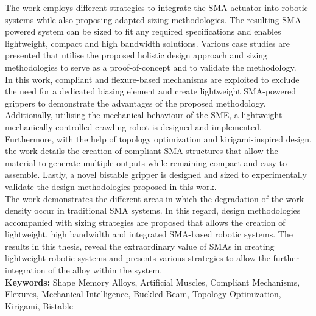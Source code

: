 The work employs different strategies to integrate the SMA actuator into robotic systems while also proposing adapted sizing methodologies. The resulting SMA-powered system can be sized to fit any required specifications and enables lightweight, compact and high bandwidth solutions. Various case studies are presented that utilise the proposed holistic design approach and sizing methodologies to serve as a proof-of-concept and to validate the methodology.\\

In this work, compliant and flexure-based mechanisms are exploited to exclude the need for a dedicated biasing element and create lightweight SMA-powered grippers to demonstrate the advantages of the proposed methodology. Additionally, utilising the mechanical behaviour of the SME, a lightweight mechanically-controlled crawling robot is designed and implemented. Furthermore, with the help of topology optimization and kirigami-inspired design, the work details the creation of compliant SMA structures that allow the material to generate multiple outputs while remaining compact and easy to assemble. Lastly, a novel bistable gripper is designed and sized to experimentally validate the design methodologies proposed in this work.\\

The work demonstrates the different areas in which the degradation of the work density occur in traditional SMA systems. In this regard, design methodologies accompanied with sizing strategies are proposed that allows the creation of lightweight, high bandwidth and integrated SMA-based robotic systems. The results in this thesis, reveal the extraordinary value of SMAs in creating lightweight robotic systems and presents various strategies to allow the further integration of the alloy within the system.\\

\textbf{Keywords:} Shape Memory Alloys, Artificial Muscles, Compliant Mechanisms, Flexures, Mechanical-Intelligence, Buckled Beam, Topology Optimization, Kirigami, Bistable

